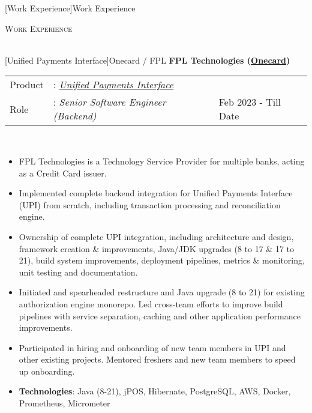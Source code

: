 \documentclass[a4paper]{article}
\newcommand{\lineunder} {
    \vspace*{-8pt} \\
    \hspace*{-18pt} \hrulefill \\
}
\newcommand{\header} [1] {
    {\hspace*{-18pt}\vspace*{6pt} \textsc{#1}}
    \vspace*{-6pt} \lineunder
}
\begin{document}
[Work Experience]{Work Experience}
\header{Work Experience}
\vspace{1mm}

[Unified Payments Interface]{Onecard / FPL}
\textbf{FPL Technologies (\href{https://www.getonecard.app/}{Onecard})} \\
\noindent
\begin{tabularx}{\textwidth}{ l l>{\raggedleft\arraybackslash}X}
	Product & : \textit{\href{https://en.wikipedia.org/wiki/Unified_Payments_Interface}{Unified Payments Interface}} &                      \\
	Role    & : \textit{Senior Software Engineer (Backend)}                                                          & Feb 2023 - Till Date \\
\end{tabularx}
\textbf{} \\
\begin{itemize} \itemsep 1pt
	\item FPL Technologies is a Technology Service Provider for multiple banks, acting as a Credit Card issuer.
	\item Implemented complete backend integration for Unified Payments Interface (UPI) from scratch, including transaction processing and reconciliation engine.
	\item Ownership of complete UPI integration, including architecture and design, framework creation \& improvements, Java/JDK upgrades (8 to 17 \& 17 to 21), build system improvements, deployment pipelines, metrics \& monitoring, unit testing and documentation.
	\item Initiated and spearheaded restructure and Java upgrade (8 to 21) for existing authorization engine monorepo. Led cross-team efforts to improve build pipelines with service separation, caching and other application performance improvements.
	\item Participated in hiring and onboarding of new team members in UPI and other existing projects. Mentored freshers and new team members to speed up onboarding.
	\item \textbf{Technologies}: Java (8-21), jPOS, Hibernate, PostgreSQL, AWS, Docker, Prometheus, Micrometer
\end{itemize}
\end{document}
